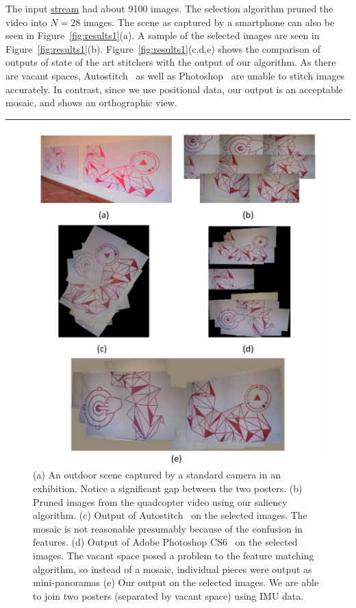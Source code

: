 \documentclass[10pt,twocolumn,letterpaper]{article}
\begin{document}
The input \href{videos/orangeBlue.avi}{stream} had about 9100 images. The
selection algorithm pruned the video into $N=28$ images. The scene as captured by a smartphone can also be seen in
Figure~\ref{fig:results1}(a). A sample of the
selected images are seen in Figure~\ref{fig:results1}(b).
Figure~\ref{fig:results1}(c,d,e) shows the comparison of outputs of state
of the art stitchers with the output of our algorithm. As there are vacant
spaces, Autostitch~\cite{autostitch} as well as Photoshop~\cite{photoshop} are
unable to stitch images accurately. In contrast, since we use positional data, our output is an acceptable mosaic, and shows
an orthographic view. 

\hrule
\begin{figure}[h!]
\centering
\includegraphics[width=0.85\linewidth]{figures/Purple_red.pdf}
\caption{(a) An outdoor scene captured by a standard camera in an
  exhibition. Notice a   significant gap between the two posters.  (b) Pruned
  images from the quadcopter video using our saliency algorithm. (c) Output of
  Autostitch~\cite{autostitch} on the selected images. The mosaic is not
  reasonable presumably because of the confusion in features. (d) Output of Adobe
  Photoshop CS6~\cite{photoshop} on the selected images. The vacant space posed a
  problem to the feature matching algorithm, so instead of a mosaic,
  individual pieces were output as mini-panoramas (e) Our output on
  the selected images. We are able to join two posters (separated by
  vacant space) using IMU data.}
\label{fig:results2}
\end{figure}
	
\end{document}
